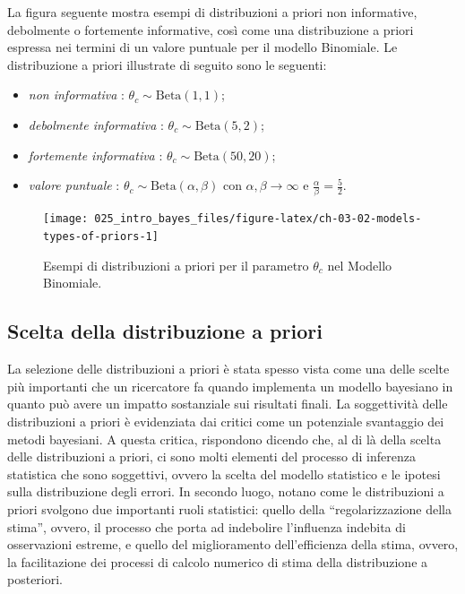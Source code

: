 \documentclass[
]{memoir}
\providecommand{\tightlist}{%
  \setlength{\itemsep}{0pt}\setlength{\parskip}{0pt}}
\theoremstyle{definition}
\theoremstyle{definition}
\theoremstyle{definition}
\theoremstyle{definition}
\theoremstyle{remark}
\begin{document}
La figura seguente mostra esempi di distribuzioni a priori non informative, debolmente o fortemente informative, così come una distribuzione a priori espressa nei termini di un valore puntuale per il modello Binomiale. Le distribuzione a priori illustrate di seguito sono le seguenti:

\begin{itemize}
\tightlist
\item
  \emph{non informativa} : \(\theta_c \sim \text{Beta}(1,1)\);
\item
  \emph{debolmente informativa} : \(\theta_c \sim \text{Beta}(5,2)\);
\item
  \emph{fortemente informativa} : \(\theta_c \sim \text{Beta}(50,20)\);
\item
  \emph{valore puntuale} : \(\theta_c \sim \text{Beta}(\alpha, \beta)\) con \(\alpha, \beta \rightarrow \infty\) e \(\frac{\alpha}{\beta} = \frac{5}{2}\).
\end{itemize}

\begin{figure}

{\centering \texttt{[image: 025\_intro\_bayes\_files/figure-latex/ch-03-02-models-types-of-priors-1]} 

}

\caption{Esempi di distribuzioni a priori per il parametro $\theta_c$ nel Modello Binomiale.}\label{fig:ch-03-02-models-types-of-priors}
\end{figure}

\hypertarget{scelta-della-distribuzione-a-priori}{%
\subsection{Scelta della distribuzione a priori}\label{scelta-della-distribuzione-a-priori}}

La selezione delle distribuzioni a priori è stata spesso vista come una delle scelte più importanti che un ricercatore fa quando implementa un modello bayesiano in quanto può avere un impatto sostanziale sui risultati finali. La soggettività delle distribuzioni a priori è evidenziata dai critici come un potenziale svantaggio dei metodi bayesiani. A questa critica, \citet{vandeSchoot2021modelling} rispondono dicendo che, al di là della scelta delle distribuzioni a priori, ci sono molti elementi del processo di inferenza statistica che sono soggettivi, ovvero la scelta del modello statistico e le ipotesi sulla distribuzione degli errori. In secondo luogo, \citet{vandeSchoot2021modelling} notano come le distribuzioni a priori svolgono due importanti ruoli statistici: quello della ``regolarizzazione della stima'', ovvero, il processo che porta ad indebolire l'influenza indebita di osservazioni estreme, e quello del miglioramento dell'efficienza della stima, ovvero, la facilitazione dei processi di calcolo numerico di stima della distribuzione a posteriori.
\end{document}
